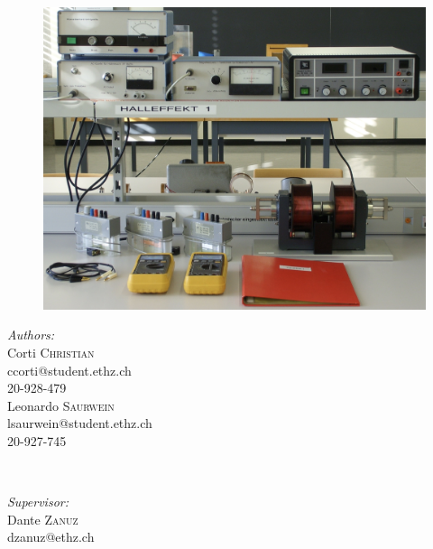 \documentclass{article}
\begin{document}
\begin{titlepage}
		\begin{figure}[h!]
		    \centering
		    \includegraphics[scale=0.10]{39_Preview.jpg}
		\end{figure}
		
		\begin{minipage}{0.4\textwidth}
			\begin{flushleft} \large
				\emph{Authors:}\\
				Corti \textsc{Christian} \\ ccorti@student.ethz.ch \\ 20-928-479 \\
				\vspace{1mm}
				Leonardo \textsc{Saurwein} \\lsaurwein@student.ethz.ch \\20-927-745
			\end{flushleft}
		\end{minipage}
		~
		\begin{minipage}{0.5\textwidth}
			\begin{flushright} \large
				\emph{Supervisor:} \\
				Dante \textsc{Zanuz} \\ dzanuz@ethz.ch %
			\end{flushright}
		\end{minipage}\\[2cm]
		\vfill
\end{titlepage}

\newpage

\tableofcontents{}
\end{document}
